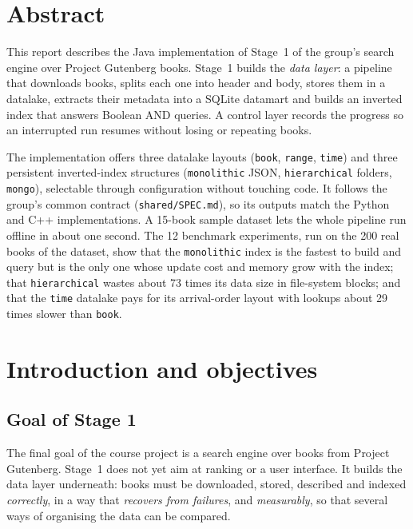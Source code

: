\documentclass[11pt,a4paper]{article}
\newcommand{\code}[1]{\texttt{#1}}
\begin{document}
\section*{Abstract}
This report describes the Java implementation of Stage~1 of the group's search engine over
Project Gutenberg books. Stage~1 builds the \emph{data layer}: a pipeline that downloads books,
splits each one into header and body, stores them in a datalake, extracts their metadata into a
SQLite datamart and builds an inverted index that answers Boolean AND queries. A control layer
records the progress so an interrupted run resumes without losing or repeating books.

The implementation offers three datalake layouts (\code{book}, \code{range}, \code{time}) and three
persistent inverted-index structures (\code{monolithic} JSON, \code{hierarchical} folders,
\code{mongo}), selectable through configuration without touching code. It follows the group's
common contract (\code{shared/SPEC.md}), so its outputs match the Python and C++ implementations. A
15-book sample dataset lets the whole pipeline run offline in about one second. The 12 benchmark
experiments, run on the 200 real books of the dataset, show that the \code{monolithic} index is the
fastest to build and query but is the only one whose update cost and memory grow with the index;
that \code{hierarchical} wastes about 73 times its data size in file-system blocks; and that the
\code{time} datalake pays for its arrival-order layout with lookups about 29 times slower than
\code{book}.

\tableofcontents
\newpage

\section{Introduction and objectives}

\subsection{Goal of Stage 1}
The final goal of the course project is a search engine over books from Project Gutenberg. Stage~1
does not yet aim at ranking or a user interface. It builds the data layer underneath: books must be
downloaded, stored, described and indexed \emph{correctly}, in a way that \emph{recovers from
failures}, and \emph{measurably}, so that several ways of organising the data can be compared.
\end{document}

